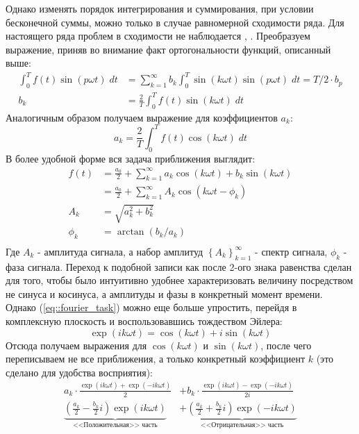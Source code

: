 Однако изменять порядок интегрирования и суммирования, при условии бесконечной суммы, можно только в случае равномерной сходимости ряда. Для настоящего ряда проблем в сходимости не наблюдается \cite{teljacovski2001convergence}, \cite{mipt2004fourier}. Преобразуем выражение, приняв во внимание факт ортогональности функций, описанный выше:
\begin{equation}
	\begin{split}
		\int_{0}^T f(t) \sin(p \omega t) \; dt & = \sum_{k = 1}^{\infty} b_k \int_0^T \sin(k \omega t)\sin(p \omega t) \; dt = T / 2  \cdot b_p \\
		b_k & = \frac{2}{T}  \int_{0}^T f(t) \sin(k \omega t) \; dt 
	\end{split}
\end{equation}
Аналогичным образом получаем выражение для коэффициентов $a_k$:
\begin{equation}
	a_k = \frac{2}{T}  \int_{0}^T f(t) \cos(k \omega t) \; dt 
\end{equation}
В более удобной форме вся задача приближения выглядит:
\begin{equation} \label{eq::fourier_task}
	\begin{split}
		f(t) & = \frac{a_0}{2} + \sum_{k = 1}^{\infty} a_k\cos(k \omega t) + b_k\sin(k \omega t)\\
		& = \frac{a_0}{2} + \sum_{k = 1}^{\infty} A_k \cos(k \omega t - \phi_k)\\
		A_k & = \sqrt{a_k^2 + b_k^2}\\
		\phi_k & = \arctan(b_k / a_k)\\
	\end{split}
\end{equation}
Где $A_k$ - амплитуда сигнала, а набор амплитуд $\left\{A_k\right\}_{k = 1}^\infty$ - спектр сигнала, $\phi_k$ - фаза сигнала. Переход к подобной записи как после 2-ого знака равенства сделан для того, чтобы было интуитивно удобнее характеризовать величину посредством не синуса и косинуса, а амплитуды и фазы в конкретный момент времени. Однако (\ref{eq::fourier_task}) можно еще больше упростить, перейдя в комплексную плоскость и воспользовавшись тождеством Эйлера:
\begin{equation}
	\exp(i k \omega t) = \cos(k \omega t) + i \sin(k \omega t)
\end{equation}
Отсюда получаем выражения для $\cos(k \omega t)$ и $\sin(k \omega t)$, после чего переписываем не все приближения, а только конкретный коэффициент $k$ (это сделано для удобства восприятия):
\begin{equation}
	\begin{split}
		a_k \cdot \frac{\exp(i k \omega t) + \exp(-i k \omega t)}{2} & + b_k \cdot \frac{\exp(i k \omega t) - \exp(-i k \omega t)}{2i}\\
		\underbrace{\left( \frac{a_k}{2} - \frac{b_k}{2} i \right) \exp(i k \omega t)}_{\text{<<Положительная>> часть}} & + \underbrace{\left( \frac{a_k}{2} + \frac{b_k}{2} i \right) \exp(-i k \omega t)}_{\text{<<Отрицательная>> часть}}
	\end{split}
\end{equation}
